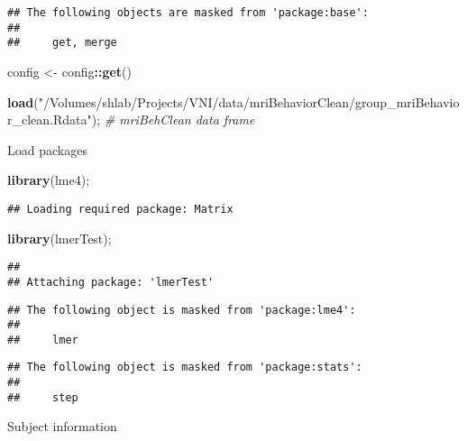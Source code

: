 \documentclass[]{article}
\newenvironment{Shaded}{\begin{snugshade}}{\end{snugshade}}
\newcommand{\CommentTok}[1]{\textcolor[rgb]{0.56,0.35,0.01}{\textit{#1}}}
\newcommand{\KeywordTok}[1]{\textcolor[rgb]{0.13,0.29,0.53}{\textbf{#1}}}
\newcommand{\NormalTok}[1]{#1}
\newcommand{\OperatorTok}[1]{\textcolor[rgb]{0.81,0.36,0.00}{\textbf{#1}}}
\newcommand{\StringTok}[1]{\textcolor[rgb]{0.31,0.60,0.02}{#1}}
\begin{document}
\begin{verbatim}
## The following objects are masked from 'package:base':
## 
##     get, merge
\end{verbatim}

\begin{Shaded}
\begin{Highlighting}[]
\NormalTok{config <-}\StringTok{ }\NormalTok{config}\OperatorTok{::}\KeywordTok{get}\NormalTok{()}

\KeywordTok{load}\NormalTok{(}\StringTok{"/Volumes/shlab/Projects/VNI/data/mriBehaviorClean/group_mriBehavior_clean.Rdata"}\NormalTok{); }\CommentTok{# mriBehClean data frame}
\end{Highlighting}
\end{Shaded}

Load packages

\begin{Shaded}
\begin{Highlighting}[]
\KeywordTok{library}\NormalTok{(lme4);}
\end{Highlighting}
\end{Shaded}

\begin{verbatim}
## Loading required package: Matrix
\end{verbatim}

\begin{Shaded}
\begin{Highlighting}[]
\KeywordTok{library}\NormalTok{(lmerTest);}
\end{Highlighting}
\end{Shaded}

\begin{verbatim}
## 
## Attaching package: 'lmerTest'
\end{verbatim}

\begin{verbatim}
## The following object is masked from 'package:lme4':
## 
##     lmer
\end{verbatim}

\begin{verbatim}
## The following object is masked from 'package:stats':
## 
##     step
\end{verbatim}

Subject information

\begin{Shaded}
\end{Shaded}
\end{document}
